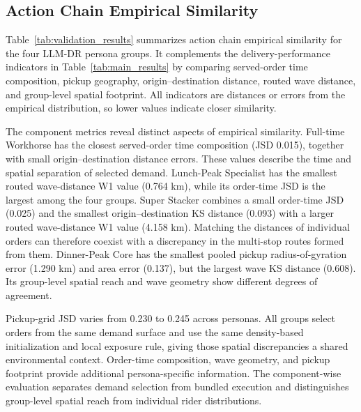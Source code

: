 \documentclass[letterpaper,journal]{IEEEtran}
\begin{document}
\subsection{Action Chain Empirical Similarity}
Table~\ref{tab:validation_results} summarizes action chain empirical similarity for the four LLM-DR persona groups. It complements the delivery-performance indicators in Table~\ref{tab:main_results} by comparing served-order time composition, pickup geography, origin--destination distance, routed wave distance, and group-level spatial footprint. All indicators are distances or errors from the empirical distribution, so lower values indicate closer similarity.

The component metrics reveal distinct aspects of empirical similarity. Full-time Workhorse has the closest served-order time composition (JSD 0.015), together with small origin--destination distance errors. These values describe the time and spatial separation of selected demand. Lunch-Peak Specialist has the smallest routed wave-distance W1 value (0.764 km), while its order-time JSD is the largest among the four groups. Super Stacker combines a small order-time JSD (0.025) and the smallest origin--destination KS distance (0.093) with a larger routed wave-distance W1 value (4.158 km). Matching the distances of individual orders can therefore coexist with a discrepancy in the multi-stop routes formed from them. Dinner-Peak Core has the smallest pooled pickup radius-of-gyration error (1.290 km) and area error (0.137), but the largest wave KS distance (0.608). Its group-level spatial reach and wave geometry show different degrees of agreement.

Pickup-grid JSD varies from 0.230 to 0.245 across personas. All groups select orders from the same demand surface and use the same density-based initialization and local exposure rule, giving those spatial discrepancies a shared environmental context. Order-time composition, wave geometry, and pickup footprint provide additional persona-specific information. The component-wise evaluation separates demand selection from bundled execution and distinguishes group-level spatial reach from individual rider distributions.
\end{document}
